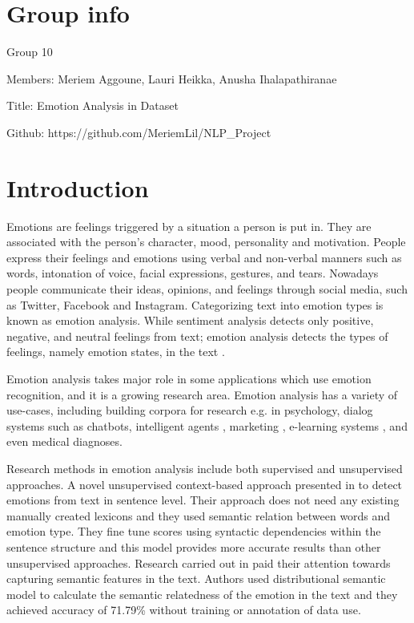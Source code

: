 \documentclass[conference]{IEEEtran}
\begin{document}
\section{Group info}
Group 10

Members: Meriem Aggoune, Lauri Heikka, Anusha Ihalapathiranae

Title: Emotion Analysis in Dataset

Github: https://github.com/MeriemLil/NLP\_Project

\section{Introduction}
Emotions are feelings triggered by a situation a person is put in. They are associated with the person’s character, mood, personality and motivation. People express their feelings and emotions using verbal and non-verbal manners such as words, intonation of voice, facial expressions, gestures, and tears. Nowadays people communicate their ideas, opinions, and feelings through social media, such as Twitter, Facebook and Instagram. Categorizing text into emotion types is known as emotion analysis. While sentiment analysis detects only positive, negative, and neutral feelings from text; emotion analysis detects the types of feelings, namely emotion states, in the text \cite{emotiondetection}. 

Emotion analysis takes major role in some applications which use emotion recognition, and it is a growing research area. Emotion analysis has a variety of use-cases, including building corpora for research e.g. in psychology, dialog systems such as chatbots, intelligent agents \cite{klinger2018analysis}, marketing \cite{businesscase}, e-learning systems \cite{elearning}, and even medical diagnoses\cite{calvo2017natural}.

Research methods  in emotion analysis include both supervised and unsupervised approaches. A novel unsupervised context-based approach presented in \cite{unsupervisedemotiondetection} to detect emotions from text in sentence level. Their approach does not need any existing manually created lexicons and they used semantic relation between words and emotion type. They fine tune scores using syntactic dependencies within the sentence structure and this model provides more accurate results than other unsupervised approaches. Research carried out in \cite{jan2020emotion} paid their attention towards capturing semantic features in the text. Authors used distributional semantic model to calculate the semantic relatedness of the emotion in the text and they achieved accuracy of 71.79\% without training or annotation of data use.
\end{document}

